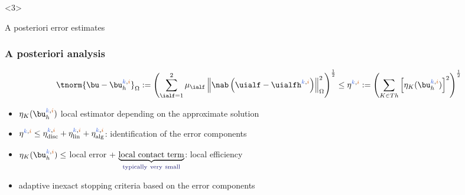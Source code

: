 \begin{frame}
\begin{onlyenv}<3>
\begin{center}
\Huge{\textcolor{carmine}{A posteriori error estimates}}
\end{center}
\end{onlyenv}
\end{frame}
%
\begin{frame}
\frametitle{A posteriori analysis}
\begin{equation*}
\tnorm{\bu-\bu_h^{\kk,\ii}}_{\Omega} \egaldef \left(\sum_{\ialf = 1}^2 \mu_\ialf \left\|\nab \left(\uialf-\uialfh^{\kk,\ii} \right)\right\|_{\Omega}^2 \right)^{\frac{1}{2}} \leq \eta^{\kk,\ii} \egaldef \left(\sum_{K \in Th}\left[\eta_{K}(\bu_h^{\kk,\ii}) \right]^2\right)^{\frac{1}{2}}
\end{equation*}
\begin{itemize}
\item $\eta_{K}(\bu_h^{\kk,\ii})$ local estimator depending on the approximate solution 
\item $\eta^{\kk,\ii} \leq \eta_{\mathrm{disc}}^{\kk,\ii} + \eta_{\mathrm{lin}}^{\kk,\ii} + \eta_{\mathrm{alg}}^{\kk,\ii}$: identification of the error components
\item $\eta_{K}(\bu_h^{\kk,\ii}) \leq$ local error + $\underbrace{\mathrm{local \ contact \ term}}_{\mathrm{\textcolor{midnightblue}{typically \ very \ small}}}$: local efficiency
\item adaptive inexact stopping criteria based on the error components
\end{itemize} 
\end{frame}
%
